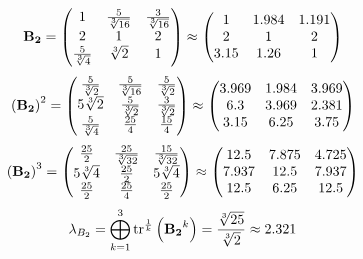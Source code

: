 \documentclass[10pt,a4paper]{article}
\begin{document}
	\[
		\bold{B_2} = 
		\begin{pmatrix}
			{1} {} & \frac{{5}} {\sqrt[3]{16}} & \frac{{3}} {\sqrt[3]{16}} \\
			{{2}} {} & {1} {} & {{2}} {} \\
			\frac{{5}} {\sqrt[3]{4}} & {\sqrt[3]{2}} {} & {1} {} \\
		\end{pmatrix}
		\approx
		\begin{pmatrix}
			1        & 1.984    & 1.191    \\
			2        & 1        & 2        \\
			3.15     & 1.26     & 1        \\
		\end{pmatrix}
	\]
	\[
		\left(\bold{B_2}\right)^{2} = 
		\begin{pmatrix}
			\frac{{5}} {\sqrt[3]{2}} & \frac{{5}} {\sqrt[3]{16}} & \frac{{5}} {\sqrt[3]{2}} \\
			{{5}\sqrt[3]{2}} {} & \frac{{5}} {\sqrt[3]{2}} & \frac{{3}} {\sqrt[3]{2}} \\
			\frac{{5}} {\sqrt[3]{4}} & \frac{{25}} {{4}} & \frac{{15}} {{4}} \\
		\end{pmatrix}
		\approx
		\begin{pmatrix}
			3.969    & 1.984    & 3.969    \\
			6.3      & 3.969    & 2.381    \\
			3.15     & 6.25     & 3.75     \\
		\end{pmatrix}
	\]
	\[
		\left(\bold{B_2}\right)^{3} = 
		\begin{pmatrix}
			\frac{{25}} {{2}} & \frac{{25}} {\sqrt[3]{32}} & \frac{{15}} {\sqrt[3]{32}} \\
			{{5}\sqrt[3]{4}} {} & \frac{{25}} {{2}} & {{5}\sqrt[3]{4}} {} \\
			\frac{{25}} {{2}} & \frac{{25}} {{4}} & \frac{{25}} {{2}} \\
		\end{pmatrix}
		\approx
		\begin{pmatrix}
			12.5     & 7.875    & 4.725    \\
			7.937    & 12.5     & 7.937    \\
			12.5     & 6.25     & 12.5     \\
		\end{pmatrix}
	\]
	\[
		\lambda_{B_2} =  \bigoplus ^{3} _{k = 1} \operatorname{tr} ^{\frac 1 k} \left( \bold{B_2} ^k \right) = \frac{\sqrt[3]{25}} {\sqrt[3]{2}}\approx 2.321
	\]
\end{document}
